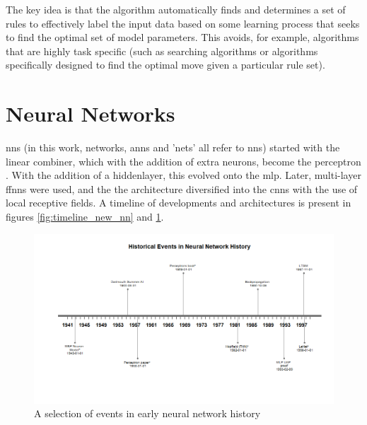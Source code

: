 
The key idea is that the algorithm automatically finds and determines a set of rules to effectively label the input data based on some learning process that seeks to find the optimal set of model parameters. This avoids, for example, algorithms that are highly task specific (such as searching algorithms or algorithms specifically designed to find the optimal move given a particular rule set). \bigskip

\section{Neural Networks} 


\gls{nn}s (in this work, networks, \gls{ann}s and 'nets' all refer to \gls{nn}s) started with the linear combiner, which with the addition of extra neurons, become the perceptron \cite{haykin}. With the addition of a \gls{hiddenlayer}, this evolved onto the \gls{mlp}. Later, multi-layer \gls{ffnn}s were used, and the the architecture diversified into the \gls{cnn}s with the use of local receptive fields. A timeline of developments and architectures is present in figures \ref{fig:timeline_new_nn} and \ref{fig:timeline_old_nn}. \bigskip

\begin{figure}
    \centering
    \includegraphics[width=140mm,scale=1.5]{figs/timeline_old_nn.png}
    \caption{A selection of events in early neural network history}
    \label{fig:timeline_old_nn}
\end{figure}

